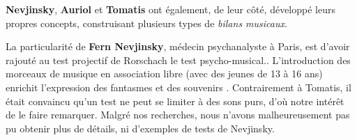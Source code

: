 



        \textbf{Nevjinsky}\autocite{nevjinsky:adolescence},\textbf{ Auriol}\autocite{auriol:cle}
      et \textbf{Tomatis} \autocite {tomatisoreilletvie} ont également, de leur côté, développé leurs propres
                   concepts, construisant plusieurs types de \emph{bilans musicaux}.

La particularité de \textbf{Fern Nevjinsky}, médecin psychanalyste à
  Paris, est d'avoir rajouté au test projectif de Rorschach le test psycho-musical.\autocite{nevjinsky:adolescence}.
L'introduction des morceaux de musique en association libre (avec
 des jeunes de 13 à 16 ans) enrichit l'expression des fantasmes et des
 souvenirs \autocite{nevjinsky:adolescence}. %
Contrairement à Tomatis,
 il était convaincu qu'un test ne peut 
se limiter à des sons purs, d'où notre intérêt de le faire remarquer. Malgré nos recherches, nous n'avons 
malheureusement pas pu obtenir plus de détails, ni d'exemples de tests de Nevjinsky.



